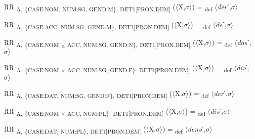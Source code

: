 {\begin{exe}
 RR \textsubscript{A,} \textsubscript{\{CASE:NOM, NUM:SG, GEND:M\},} \textsubscript{DET1[PRON.DEM]} ($\langle$X,$\sigma $$\rangle$) = \textsubscript{def} $\langle$\textit{d\=er}ˊ,$\sigma $$\rangle$
\end{exe}

\begin{exe}
 RR \textsubscript{A,} \textsubscript{\{CASE:ACC, NUM:SG, GEND:M\},} \textsubscript{DET1[PRON.DEM]} ($\langle$X,$\sigma $$\rangle$) = \textsubscript{def} $\langle$\textit{d\=e}ˊ,$\sigma $$\rangle$
\end{exe}

\begin{exe}
 RR \textsubscript{A,} \textsubscript{\{CASE:NOM} \textsubscript{${\veebar}$}\textsubscript{ ACC, NUM:SG, GEND:N\},} \textsubscript{DET1[PRON.DEM]} ($\langle$X,$\sigma $$\rangle$) = \textsubscript{def} $\langle$\textit{das}ˊ,$\sigma $$\rangle$
\end{exe}

\begin{exe}
 RR \textsubscript{A,} \textsubscript{\{CASE:NOM} \textsubscript{${\veebar}$}\textsubscript{ ACC, NUM:SG, GEND:F\},} \textsubscript{DET1[PRON.DEM]} ($\langle$X,$\sigma $$\rangle$) = \textsubscript{def} $\langle$\textit{diə}ˊ,$\sigma $$\rangle$
\end{exe}

\begin{exe}
 RR \textsubscript{A,} \textsubscript{\{CASE:DAT, NUM:SG, GEND:F\},} \textsubscript{DET1[PRON.DEM]} ($\langle$X,$\sigma $$\rangle$) = \textsubscript{def} $\langle$\textit{der}ˊ,$\sigma $$\rangle$
\end{exe}

\begin{exe}
 RR \textsubscript{A,} \textsubscript{\{CASE:NOM} \textsubscript{${\veebar}$}\textsubscript{ ACC, NUM:PL\},} \textsubscript{DET1[PRON.DEM]} ($\langle$X,$\sigma $$\rangle$) = \textsubscript{def} $\langle$\textit{diə}ˊ,$\sigma $$\rangle$
\end{exe}

\begin{exe}
 RR \textsubscript{A,} \textsubscript{\{CASE:DAT, NUM:PL\},} \textsubscript{DET1[PRON.DEM]} ($\langle$X,$\sigma $$\rangle$) = \textsubscript{def} $\langle$\textit{denə}ˊ,$\sigma $$\rangle$
\end{exe}

}
